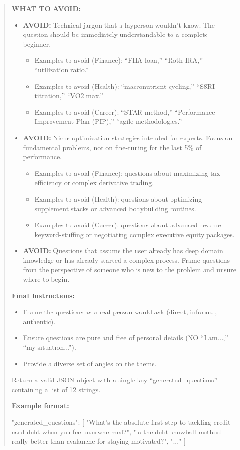 \begin{quote}
\textbf{WHAT TO AVOID:}
\begin{itemize}
\item \textbf{AVOID:} Technical jargon that a layperson wouldn't know. The question should be immediately understandable to a complete beginner.
    \begin{itemize}
    \item Examples to avoid (Finance): ``FHA loan,'' ``Roth IRA,'' ``utilization ratio.''
    \item Examples to avoid (Health): ``macronutrient cycling,'' ``SSRI titration,'' ``VO2 max.''
    \item Examples to avoid (Career): ``STAR method,'' ``Performance Improvement Plan (PIP),'' ``agile methodologies.''
    \end{itemize}
\item \textbf{AVOID:} Niche optimization strategies intended for experts. Focus on fundamental problems, not on fine-tuning for the last 5\% of performance.
    \begin{itemize}
    \item Examples to avoid (Finance): questions about maximizing tax efficiency or complex derivative trading.
    \item Examples to avoid (Health): questions about optimizing supplement stacks or advanced bodybuilding routines.
    \item Examples to avoid (Career): questions about advanced resume keyword-stuffing or negotiating complex executive equity packages.
    \end{itemize}
\item \textbf{AVOID:} Questions that assume the user already has deep domain knowledge or has already started a complex process. Frame questions from the perspective of someone who is new to the problem and unsure where to begin.
\end{itemize}

\textbf{Final Instructions:}
\begin{itemize}
\item Frame the questions as a real person would ask (direct, informal, authentic).
\item Ensure questions are pure and free of personal details (NO ``I am...,'' ``my situation...'').
\item Provide a diverse set of angles on the theme.
\end{itemize}

Return a valid JSON object with a single key ``generated\_questions'' containing a list of 12 strings.

\textbf{Example format:}
\begin{promptcode}
{
    "generated_questions": [
        "What's the absolute first step to tackling 
         credit card debt when you feel overwhelmed?",
        "Is the debt snowball method really better 
         than avalanche for staying motivated?",
        "..."
    ]
}
\end{promptcode}
\end{quote}



